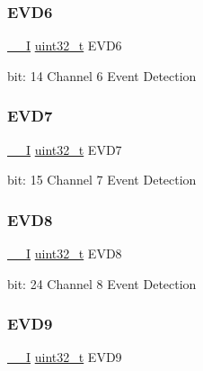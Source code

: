 \subsubsection{\texorpdfstring{EVD6}{EVD6}}
{\footnotesize\ttfamily \mbox{\hyperlink{core__cm0plus_8h_af63697ed9952cc71e1225efe205f6cd3}{\+\_\+\+\_\+I}} \mbox{\hyperlink{union_e_v_s_y_s___i_n_t_f_l_a_g___type_a7c2ec0f7b3f1314bdede58b182af397c}{uint32\+\_\+t}} E\+V\+D6}

bit\+: 14 Channel 6 Event Detection \mbox{\label{union_e_v_s_y_s___i_n_t_f_l_a_g___type_a5dc81f3631fe27ff74d31e3f1329e2e0}} 
\subsubsection{\texorpdfstring{EVD7}{EVD7}}
{\footnotesize\ttfamily \mbox{\hyperlink{core__cm0plus_8h_af63697ed9952cc71e1225efe205f6cd3}{\+\_\+\+\_\+I}} \mbox{\hyperlink{union_e_v_s_y_s___i_n_t_f_l_a_g___type_a7c2ec0f7b3f1314bdede58b182af397c}{uint32\+\_\+t}} E\+V\+D7}

bit\+: 15 Channel 7 Event Detection \mbox{\label{union_e_v_s_y_s___i_n_t_f_l_a_g___type_aeefdc0710a9f5c303c28d4d78e5fc8ac}} 
\subsubsection{\texorpdfstring{EVD8}{EVD8}}
{\footnotesize\ttfamily \mbox{\hyperlink{core__cm0plus_8h_af63697ed9952cc71e1225efe205f6cd3}{\+\_\+\+\_\+I}} \mbox{\hyperlink{union_e_v_s_y_s___i_n_t_f_l_a_g___type_a7c2ec0f7b3f1314bdede58b182af397c}{uint32\+\_\+t}} E\+V\+D8}

bit\+: 24 Channel 8 Event Detection \mbox{\label{union_e_v_s_y_s___i_n_t_f_l_a_g___type_a50d4efc17203226c966e9b134ab9f0ce}} 
\subsubsection{\texorpdfstring{EVD9}{EVD9}}
{\footnotesize\ttfamily \mbox{\hyperlink{core__cm0plus_8h_af63697ed9952cc71e1225efe205f6cd3}{\+\_\+\+\_\+I}} \mbox{\hyperlink{union_e_v_s_y_s___i_n_t_f_l_a_g___type_a7c2ec0f7b3f1314bdede58b182af397c}{uint32\+\_\+t}} E\+V\+D9}

